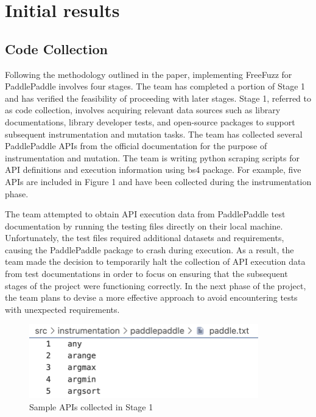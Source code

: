 \documentclass[sigconf]{acmart}
\begin{document}
\section{Initial results}
\subsection{Code Collection}
Following the methodology outlined in the paper, implementing FreeFuzz for PaddlePaddle involves four stages. 
The team has completed a portion of Stage 1 and has verified the feasibility of proceeding with later stages. 
Stage 1, referred to as code collection, involves acquiring relevant data sources such as library documentations,
 library developer tests, and open-source packages to support subsequent instrumentation and mutation tasks. 
 The team has collected several PaddlePaddle APIs from the official documentation for the purpose of instrumentation and mutation.
  The team is writing python scraping scripts for API definitions and execution information using bs4 package. For example, 
  five APIs are included in Figure 1 and have been collected during the instrumentation phase.
  \par The team attempted to obtain API execution data from PaddlePaddle test documentation by running the testing 
  files directly on their local machine. Unfortunately, the test files required additional datasets and requirements, 
  causing the PaddlePaddle package to crash during execution. As a result, the team made the decision to temporarily halt 
  the collection of API execution data from test documentations in order to focus on ensuring that the subsequent stages of the project were functioning correctly.
   In the next phase of the project, the team plans to devise a more effective approach to avoid encountering tests with unexpected requirements.

  \begin{figure}[h]
    \centering
    \includegraphics[width=\linewidth]{1.png}
    \caption{Sample APIs collected in Stage 1}
  \end{figure}  
\end{document}
